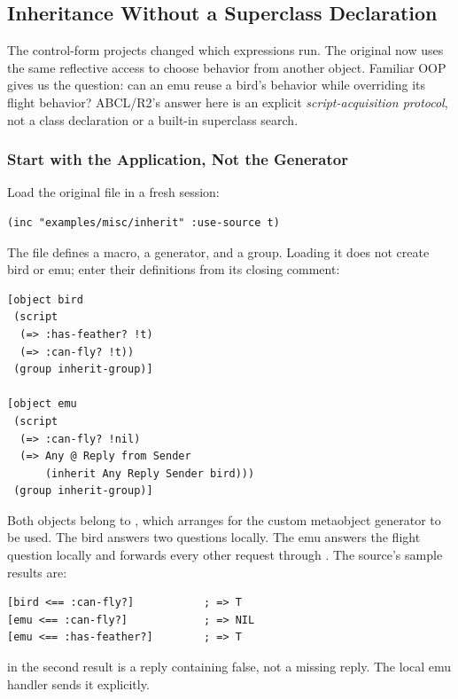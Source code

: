 \subsection{Inheritance Without a Superclass Declaration}
\label{sec:original-inherit}

The control-form projects changed which expressions run. The original
 now uses the same reflective
access to choose behavior from another object.
Familiar OOP gives us the question: can an emu reuse a bird's
behavior while overriding its flight behavior?
ABCL/R2's answer here is an explicit \emph{script-acquisition protocol},
not a class declaration or a built-in superclass search.

\subsubsection{Start with the Application, Not the Generator}

Load the original file in a fresh session:
\begin{lstlisting}
(inc "examples/misc/inherit" :use-source t)
\end{lstlisting}
The file defines a macro, a generator, and a group. Loading it does not
create bird or emu; enter their definitions from its closing comment:
\begin{codeblock}
\begin{lstlisting}
[object bird
 (script
  (=> :has-feather? !t)
  (=> :can-fly? !t))
 (group inherit-group)]

[object emu
 (script
  (=> :can-fly? !nil)
  (=> Any @ Reply from Sender
      (inherit Any Reply Sender bird)))
 (group inherit-group)]
\end{lstlisting}
\end{codeblock}

Both objects belong to , which arranges for the
custom metaobject generator to be used.
The bird answers two questions locally. The emu answers the flight
question locally and forwards every other request through .
The source's sample results are:
\begin{lstlisting}
[bird <== :can-fly?]           ; => T
[emu <== :can-fly?]            ; => NIL
[emu <== :has-feather?]        ; => T
\end{lstlisting}
 in the second result is a reply containing false, not a
missing reply. The local emu handler sends it explicitly.


